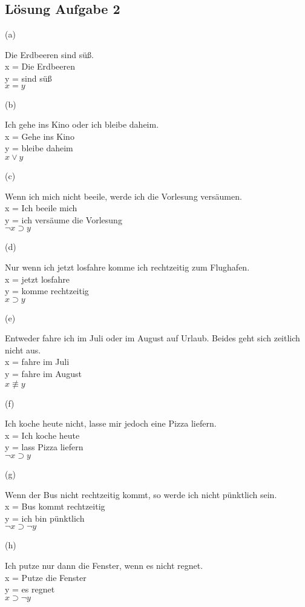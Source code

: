 \documentclass[a4paper, margins=3cm]{homework}
\begin{document}
\subsection*{Lösung Aufgabe 2}
	(a)
	\begin{center}
		Die Erdbeeren sind süß.\\
		x = Die Erdbeeren\\
		y = sind süß \\
		$x = y$
	\end{center}
	\newpage
	(b)
	\begin{center}
		Ich gehe ins Kino oder ich bleibe daheim. \\
		x = Gehe ins Kino \\
		y = bleibe daheim \\
		$x \vee y$
	\end{center}
	(c)
	\begin{center}
		Wenn ich mich nicht beeile, werde ich die Vorlesung versäumen. \\
		x = Ich beeile mich \\
		y = ich versäume die Vorlesung \\
		$\neg x \supset y$ 
	\end{center}
	(d)
	\begin{center}
		Nur wenn ich jetzt losfahre komme ich rechtzeitig zum Flughafen. \\
		x = jetzt losfahre \\
		y = komme rechtzeitig \\
		$x \supset y$
	\end{center}
	(e)
	\begin{center}
		Entweder fahre ich im Juli oder im August auf Urlaub. Beides geht sich zeitlich nicht
		aus. \\
		x = fahre im Juli \\
		y = fahre im August \\
		$x \not\equiv y$
	\end{center}
	(f)
	\begin{center}
		Ich koche heute nicht, lasse mir jedoch eine Pizza liefern. \\
		x = Ich koche heute \\
		y = lass Pizza liefern \\
		$\neg x \supset y$
	\end{center}
	(g)
	\begin{center}
		Wenn der Bus nicht rechtzeitig kommt, so werde ich nicht pünktlich sein. \\
		x = Bus kommt rechtzeitig \\
		y = ich bin pünktlich \\
		$\neg x \supset \neg y$
	\end{center}
	(h)
	\begin{center}
		Ich putze nur dann die Fenster, wenn es nicht regnet. \\
		x = Putze die Fenster \\
		y = es regnet \\
		$x \supset \neg y$
	\end{center}
\end{document}
